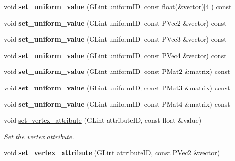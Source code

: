 \begin{DoxyCompactItemize}
void {\bfseries set\+\_\+uniform\+\_\+value} (G\+Lint uniform\+ID, const float(\&vector)\mbox{[}4\mbox{]}) const
\item 
\mbox{\label{classprz_1_1_shader___program_a045e58631bcd993b66e66f45e26702ab}} 
void {\bfseries set\+\_\+uniform\+\_\+value} (G\+Lint uniform\+ID, const P\+Vec2 \&vector) const
\item 
\mbox{\label{classprz_1_1_shader___program_ab413a6895a511a6f9f9f527257ec58e1}} 
void {\bfseries set\+\_\+uniform\+\_\+value} (G\+Lint uniform\+ID, const P\+Vec3 \&vector) const
\item 
\mbox{\label{classprz_1_1_shader___program_a0d4b3d74860096c4769cb14a20050ab1}} 
void {\bfseries set\+\_\+uniform\+\_\+value} (G\+Lint uniform\+ID, const P\+Vec4 \&vector) const
\item 
\mbox{\label{classprz_1_1_shader___program_a84f2ca8b8f69ee24340be2e5325ce1e4}} 
void {\bfseries set\+\_\+uniform\+\_\+value} (G\+Lint uniform\+ID, const P\+Mat2 \&matrix) const
\item 
\mbox{\label{classprz_1_1_shader___program_a5d4e6ab941e7105315166a27bee3a417}} 
void {\bfseries set\+\_\+uniform\+\_\+value} (G\+Lint uniform\+ID, const P\+Mat3 \&matrix) const
\item 
\mbox{\label{classprz_1_1_shader___program_ad86458c707d66524d4c7c1d8d1110650}} 
void {\bfseries set\+\_\+uniform\+\_\+value} (G\+Lint uniform\+ID, const P\+Mat4 \&matrix) const
\item 
void \mbox{\hyperlink{classprz_1_1_shader___program_ab82a2f5de5de8a1031ff3c59b48e917f}{set\+\_\+vertex\+\_\+attribute}} (G\+Lint attribute\+ID, const float \&value)
\begin{DoxyCompactList}\small\item\em Set the vertex attribute. \end{DoxyCompactList}\item 
\mbox{\label{classprz_1_1_shader___program_a6e5450a3d68bac846bb1bd8478854953}} 
void {\bfseries set\+\_\+vertex\+\_\+attribute} (G\+Lint attribute\+ID, const P\+Vec2 \&vector)

\end{DoxyCompactItemize}
